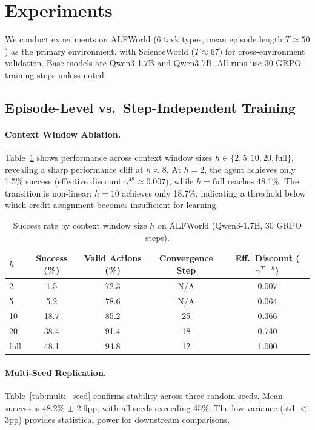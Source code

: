 \documentclass[11pt]{article}
\begin{document}
\section{Experiments}

We conduct experiments on ALFWorld (6 task types, mean episode length $T \approx 50$) as the primary environment, with ScienceWorld ($T \approx 67$) for cross-environment validation. Base models are Qwen3-1.7B and Qwen3-7B. All runs use 30 GRPO training steps unless noted.

\subsection{Episode-Level vs.\ Step-Independent Training}

\paragraph{Context Window Ablation.}
Table~\ref{tab:h_sweep} shows performance across context window sizes $h \in \{2, 5, 10, 20, \text{full}\}$, revealing a sharp performance cliff at $h \approx 8$. At $h = 2$, the agent achieves only 1.5\% success (effective discount $\gamma^{48} \approx 0.007$), while $h = \text{full}$ reaches 48.1\%. The transition is non-linear: $h = 10$ achieves only 18.7\%, indicating a threshold below which credit assignment becomes insufficient for learning.

\begin{table}[h]
\centering
\caption{Success rate by context window size $h$ on ALFWorld (Qwen3-1.7B, 30 GRPO steps).}
\label{tab:h_sweep}
\begin{tabular}{lcccc}
\toprule
$h$ & Success (\%) & Valid Actions (\%) & Convergence Step & Eff.\ Discount ($\gamma^{T-h}$) \\
\midrule
2 & 1.5 & 72.3 & N/A & 0.007 \\
5 & 5.2 & 78.6 & N/A & 0.064 \\
10 & 18.7 & 85.2 & 25 & 0.366 \\
20 & 38.4 & 91.4 & 18 & 0.740 \\
full & 48.1 & 94.8 & 12 & 1.000 \\
\bottomrule
\end{tabular}
\end{table}

\paragraph{Multi-Seed Replication.}
Table~\ref{tab:multi_seed} confirms stability across three random seeds. Mean success is 48.2\% $\pm$ 2.9pp, with all seeds exceeding 45\%. The low variance (std $<$ 3pp) provides statistical power for downstream comparisons.
\end{document}
